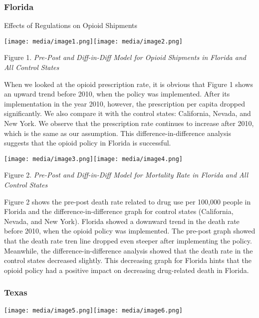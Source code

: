 \documentclass{article}
\begin{document}
\hypertarget{florida}{%
\subsubsection{Florida}\label{florida}}

{Effects of Regulations on Opioid Shipments}

\texttt{[image: media/image1.png]}\texttt{[image: media/image2.png]}

Figure 1. \emph{Pre-Post and Diff-in-Diff Model for Opioid Shipments in
Florida and All Control States}

When we looked at the opioid prescription rate, it is obvious that
Figure 1 shows an upward trend before 2010, when the policy was
implemented. After its implementation in the year 2010, however, the
prescription per capita dropped significantly. We also compare it with
the control states: California, Nevada, and New York. We observe that
the prescription rate continues to increase after 2010, which is the
same as our assumption. This difference-in-difference analysis suggests
that the opioid policy in Florida is successful.

\texttt{[image: media/image3.png]}\texttt{[image: media/image4.png]}

Figure 2. \emph{Pre-Post and Diff-in-Diff Model for Mortality Rate in
Florida and All Control States}

Figure 2 shows the pre-post death rate related to drug use per 100,000
people in Florida and the difference-in-difference graph for control
states (California, Nevada, and New York). Florida showed a downward
trend in the death rate before 2010, when the opioid policy was
implemented. The pre-post graph showed that the death rate tren line
dropped even steeper after implementing the policy. Meanwhile, the
difference-in-difference analysis showed that the death rate in the
control states decreased slightly. This decreasing graph for Florida
hints that the opioid policy had a positive impact on decreasing
drug-related death in Florida.

\hypertarget{texas}{%
\subsubsection{Texas}\label{texas}}

\texttt{[image: media/image5.png]}\texttt{[image: media/image6.png]}
\end{document}
